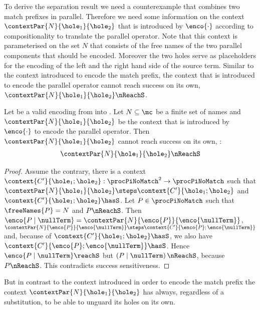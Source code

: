 \documentclass[]{article}
\begin{document}
To derive the separation result we need a counterexample that combines two match prefixes in parallel.
Therefore we need some information on the context $ \contextPar{N}{\hole_1}{\hole_2} $ that is introduced by $ \enco{\cdot} $ according to compositionality to translate the parallel operator. Note that this context is parameterised on the set $ N $ that consists of the free names of the two parallel components that should be encoded. Moreover the two holes serve as placeholders for the encoding of the left and the right hand side of the source term.
Similar to the context introduced to encode the match prefix, the context that is introduced to encode the parallel operator cannot reach success on its own, \ie $ \contextPar{N}{\hole_1}{\hole_2} \nReachS $.

\begin{lemma}
	\label{lem:parContextCannotReachSuccess}
	Let \encod be a valid encoding from \piT into \piNM.
	Let $ N \subseteq \mc $ be a finite set of names
	and $ \contextPar{N}{\hole_1}{\hole_2} $ be the context that is introduced by $ \enco{\cdot} $ to encode the parallel operator.
	Then $ \contextPar{N}{\hole_1}{\hole_2} $ cannot reach success on its own, \ie:
	\begin{align*}
		\contextPar{N}{\hole_1}{\hole_2} \nReachS
	\end{align*}
\end{lemma}

\begin{proof}
	Assume the contrary, \ie there is a context $ \context{C'}{\hole_1; \hole_2} : \procPiNoMatch^2 \to \procPiNoMatch $ such that $ \contextPar{N}{\hole_1}{\hole_2} \steps \context{C'}{\hole_1; \hole_2} $ and $ \context{C'}{\hole_1; \hole_2} \hasS $. Let $ P \in \procPiNoMatch $ such that $ \freeNames{P} = N $ and $ P \nReachS $. Then $ \enco{P \mid \nullTerm} = \contextPar{N}{\enco{P}}{\enco{\nullTerm}} $, $ \contextPar{N}{\enco{P}}{\enco{\nullTerm}} \steps \context{C'}{\enco{P}; \enco{\nullTerm}} $ and, because of $ \context{C'}{\hole_1; \hole_2} \hasS $, we also have $ \context{C'}{\enco{P}; \enco{\nullTerm}} \hasS $. Hence $ \enco{P \mid \nullTerm} \reachS $ but $ \left( P \mid \nullTerm \right) \nReachS $, because $ P \nReachS $. This contradicts success sensitiveness.
\end{proof}

But in contrast to the context introduced in order to encode the match prefix the context $ \contextPar{N}{\hole_1}{\hole_2} $ has always, \ie regardless of a substitution, to be able to unguard its holes on its own.
\end{document}
